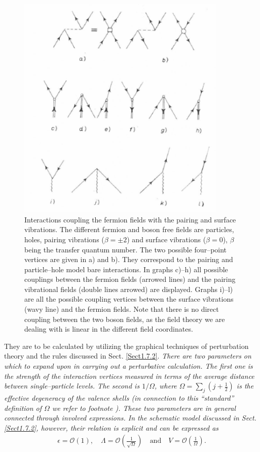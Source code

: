      \begin{figure}
     \centerline {
     \includegraphics*[width=10cm]{introduccion/figs/fig23}
     }
     \caption{Interactions coupling the fermion fields with the pairing and surface vibrations. The different fermion and boson free fields are particles, holes, pairing vibrations ($\beta=\pm2$) and surface vibrations ($\beta=0$), $\beta$ being the transfer quantum number. The two possible four--point vertices are given in a) and b). They correspond to the pairing and particle--hole model bare interactions. In graphs c)--h) all possible couplings between the fermion fields (arrowed lines) and the pairing vibrational fields (double lines arrowed) are displayed. Graphs i)--l) are all the possible coupling vertices between the surface vibrations (wavy line) and the fermion fields. Note that there is no direct coupling between the two boson fields, as the field theory we are dealing with is linear in the different field coordinates.}
     \label{figC1A6}
     \end{figure}

They are to be calculated by utilizing the graphical techniques of perturbation theory and the rules discussed in Sect. \ref{Sect1.7.2}. 
\textit{There are two parameters on which to expand upon in carrying out a perturbative  calculation. The first one is the strength of the interaction vertices measured in terms of the average distance between single--particle levels. The second is $1/\Omega$, where $\Omega=\sum_j(j+\frac{1}{2})$ is the effective degeneracy of the valence shells (in connection to this ``standard'' definition of $\Omega$ we refer to footnote ). These two parameters are in general connected through involved expressions. In the schematic model discussed in Sect. \ref{Sect1.7.2}, however, their relation is explicit and can be expressed as}
  \begin{align}\label{eqC1A86} 
   \epsilon=\mathcal O(1),\quad \Lambda=\mathcal O\left(\frac{1}{\sqrt{\Omega}}\right)\quad \text{and}\quad V=\mathcal O\left(\frac{1}{\Omega}\right).
    \end{align}   

